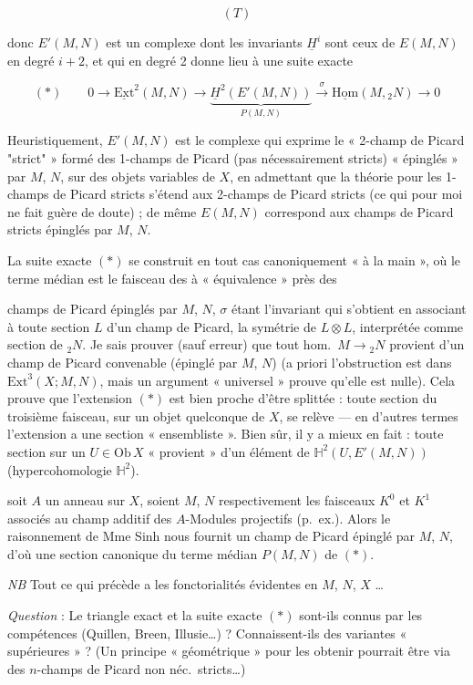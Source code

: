 \documentclass[11pt,a4paper]{article}
\begin{document}
\[ (T) \]

donc $E'(M,N)$ est un complexe dont les invariants $\underline{H}^i$ sont ceux
de $E(M,N)$ en degré $i+2$, et qui en degré 2 donne lieu à une suite exacte

\[ (*) \qquad 0 \longrightarrow \underline{\mathrm{Ext}}^2(M, N)
   \longrightarrow \underbrace{\underline{H}^2(E'(M,N))}_{P(M,N)}
   \xrightarrow{\ \sigma\ } \underline{\mathrm{Hom}}(M, {}_2 N)
   \longrightarrow 0 \]

Heuristiquement, $E'(M,N)$ est le complexe qui exprime le « 2-champ de Picard
"strict" » formé des 1-champs de Picard (pas nécessairement stricts)
« épinglés » par $M$, $N$, sur des objets variables de $X$, en admettant que
la théorie pour les 1-champs de Picard stricts s'étend aux 2-champs de Picard
stricts (ce qui pour moi ne fait guère de doute) ; de même $E(M,N)$ correspond
aux champs de Picard stricts épinglés par $M$, $N$.

La suite exacte $(*)$ se construit en tout cas canoniquement « à la main », où
le terme médian est le faisceau des  à « équivalence »
près des

 champs de Picard épinglés par $M$, $N$, $\sigma$ étant
l'invariant qui s'obtient en associant à toute section
$L$ d'un champ de Picard, la symétrie de \struck{\ill{}} $L \otimes L$,
interprétée comme section de ${}_2 N$. Je sais prouver (sauf erreur) que tout
hom.\ $M \to {}_2 N$ provient d'un champ de Picard convenable (épinglé par
$M$, $N$) (a priori l'obstruction est dans $\mathrm{Ext}^3(X; M, N)$, mais un
argument « universel » prouve qu'elle est nulle). Cela prouve que l'extension
$(*)$ est bien proche d'être splittée : \struck{\ill{}} toute section du troisième
faisceau, sur un objet quelconque de $X$, se relève --- en d'autres
\struck{\ill{}} termes l'extension a une section « ensembliste ». Bien sûr,
il y a mieux en fait : toute section sur un $U \in \mathrm{Ob}\, X$
« provient » d'un élément de $\mathbb{H}^2(U, E'(M,N))$ (hypercohomologie
$\mathbb{H}^2$).

\ill{} soit $A$ un anneau sur $X$, soient $M$, $N$ respectivement les
faisceaux $K^0$ et $K^1$ associés au champ additif des $A$-Modules projectifs
\ill{} (p.\ ex.). Alors le raisonnement de Mme Sinh nous fournit un champ de
Picard épinglé par $M$, $N$, d'où une section canonique du terme médian
$P(M,N)$ de $(*)$.

\emph{NB} Tout ce qui précède a les fonctorialités évidentes en $M$, $N$,
$X$ …

\emph{Question} : Le triangle exact  et la suite exacte
$(*)$ sont-ils connus par les compétences (Quillen, Breen, Illusie…) ?
Connaissent-ils des variantes « supérieures » ? (Un principe
« géométrique » pour les obtenir pourrait être via des $n$-champs de Picard
non néc.\ stricts…)
\end{document}
